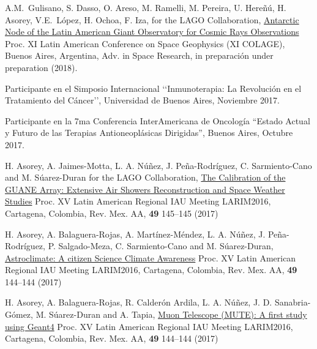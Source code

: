 \begin{etaremune}
\item {} A.M.\ Gulisano, S. Dasso, O. Areso, M. Ramelli, M. Pereira, U. Hereñú, H. Asorey, V.E.\ López, H. Ochoa, F. Iza, for the LAGO Collaboration, \href{}{{Antarctic Node of the Latin American Giant Observatory for Cosmic Rays Observations}} \en Proc.
XI Latin American Conference on Space Geophysics (XI COLAGE),  Buenos Aires, Argentina, Adv.
in Space Research, \ifeng in preparación \else under preparation \fi (2018). %
	
\item {} Participante en el Simposio Internacional \lq\lq{}Inmunoterapia: La Revolución en el Tratamiento del Cáncer\rq\rq{}, Universidad de Buenos Aires, Noviembre 2017.

\item {} Participante en la 7ma Conferencia InterAmericana de Oncología ``Estado Actual y Futuro de las Terapias Antioneoplásicas Dirigidas'', Buenos Aires, Octubre 2017. 

\item {} H. Asorey, A. Jaimes-Motta, L. A. Núñez, J. Peña-Rodríguez, C. Sarmiento-Cano and M. Súarez-Duran for the LAGO Collaboration, \href{http://www.astroscu.unam.mx/rmaa/RMxAC..49/PDF/RMxAC..49\_poster3.pdf}{{The Calibration of the GUANE Array: Extensive Air Showers Reconstruction and Space Weather Studies}} \en Proc.
XV Latin American Regional IAU Meeting LARIM2016, Cartagena, Colombia, Rev.
Mex.
AA, {\textbf{49}} 145--145 (2017)

\item {} H. Asorey, A. Balaguera-Rojas, A. Martínez-Méndez, L. A. Núñez, J. Peña-Rodríguez, P. Salgado-Meza, C. Sarmiento-Cano and M. Súarez-Duran, \href{http://www.astroscu.unam.mx/rmaa/RMxAC..49/PDF/RMxAC..49\_poster2.pdf}{{Astroclimate: A citizen Science Climate Awareness}} \en Proc.
XV Latin American Regional IAU Meeting LARIM2016, Cartagena, Colombia, Rev.
Mex.
AA, {\textbf{49}} 144--144 (2017)

\item {} H. Asorey, A. Balaguera-Rojas, R. Calderón Ardila, L. A. Núñez, J. D. Sanabria-Gómez, M. Súarez-Duran and A. Tapia, \href{http://www.astroscu.unam.mx/rmaa/RMxAC..49/PDF/RMxAC..49\_poster2.pdf}{{Muon Telescope (MUTE): A first study using Geant4}} \en Proc.
XV Latin American Regional IAU Meeting LARIM2016, Cartagena, Colombia, Rev.
Mex.
AA, {\textbf{49}} 144--144 (2017)


\end{etaremune}
